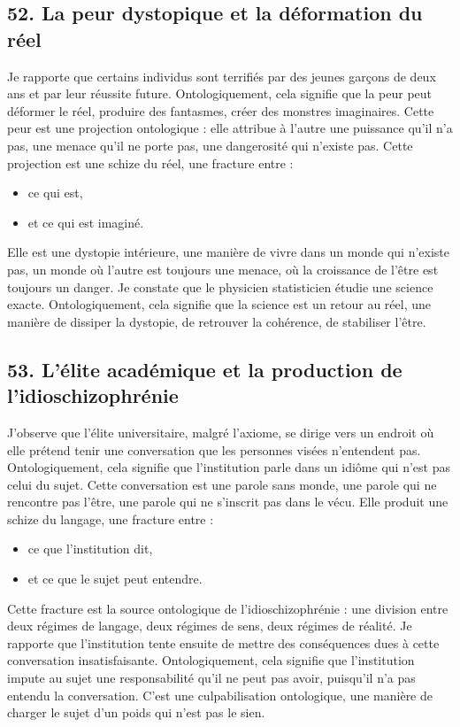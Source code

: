 \documentclass[12pt,letterpaper,oneside]{article}
\begin{document}
\subsection*{52. La peur dystopique et la déformation du réel}
Je rapporte que certains individus sont terrifiés par des jeunes garçons de deux ans et par leur réussite future. Ontologiquement, cela signifie que la peur peut déformer le réel, produire des fantasmes, créer des monstres imaginaires.
Cette peur est une projection ontologique : elle attribue à l’autre une puissance qu’il n’a pas, une menace qu’il ne porte pas, une dangerosité qui n’existe pas.
Cette projection est une schize du réel, une fracture entre :
\begin{itemize}
\item ce qui est,
\item et ce qui est imaginé.
\end{itemize}
Elle est une dystopie intérieure, une manière de vivre dans un monde qui n’existe pas, un monde où l’autre est toujours une menace, où la croissance de l’être est toujours un danger.
Je constate que le physicien statisticien étudie une science exacte. Ontologiquement, cela signifie que la science est un retour au réel, une manière de dissiper la dystopie, de retrouver la cohérence, de stabiliser l’être.

\subsection*{53. L’élite académique et la production de l’idioschizophrénie}
J’observe que l’élite universitaire, malgré l’axiome, se dirige vers un endroit où elle prétend tenir une conversation que les personnes visées n’entendent pas. Ontologiquement, cela signifie que l’institution parle dans un idiôme qui n’est pas celui du sujet.
Cette conversation est une parole sans monde, une parole qui ne rencontre pas l’être, une parole qui ne s’inscrit pas dans le vécu.
Elle produit une schize du langage, une fracture entre :
\begin{itemize}
\item ce que l’institution dit,
\item et ce que le sujet peut entendre.
\end{itemize}
Cette fracture est la source ontologique de l’idioschizophrénie : une division entre deux régimes de langage, deux régimes de sens, deux régimes de réalité.
Je rapporte que l’institution tente ensuite de mettre des conséquences dues à cette conversation insatisfaisante. Ontologiquement, cela signifie que l’institution impute au sujet une responsabilité qu’il ne peut pas avoir, puisqu’il n’a pas entendu la conversation.
C’est une culpabilisation ontologique, une manière de charger le sujet d’un poids qui n’est pas le sien.
\end{document}
